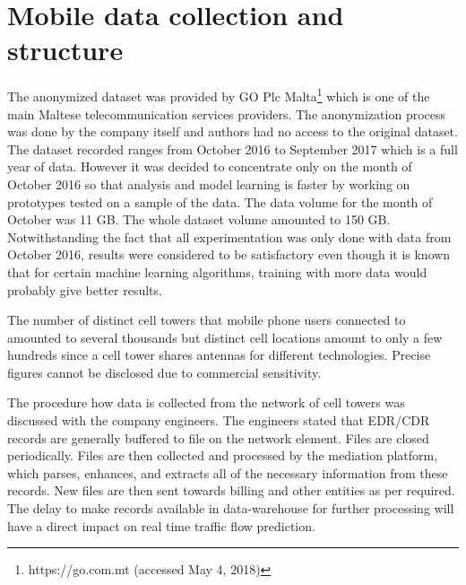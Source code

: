 \documentclass[12pt, a4paper]{report}
\theoremstyle{definition}
\theoremstyle{definition}%
\theoremstyle{definition}%
\theoremstyle{definition}%
\theoremstyle{definition}%
\theoremstyle{definition}%
\begin{document}
\section{Mobile data collection and structure} \label{section:methodology:mobile_data_collection_structure}

The anonymized dataset was provided by GO Plc Malta\footnote{https://go.com.mt (accessed May 4, 2018)} which is one of the main Maltese telecommunication services providers. The anonymization process was done by the company itself and authors had no access to the original dataset. The dataset recorded ranges from October 2016 to September 2017 which is a full year of data. However it was decided to concentrate only on the month of October 2016 so that analysis and model learning is faster by working on prototypes tested on a sample of the data. The data volume for the month of October was 11 GB. The whole dataset volume amounted to 150 GB. Notwithstanding the fact that all experimentation was only done with data from October 2016, results were considered to be satisfactory even though it is known that for certain machine learning algorithms, training with more data would probably give better results. 

The number of distinct cell towers that mobile phone users connected to amounted to several thousands but distinct cell locations amount to only a few hundreds since a cell tower shares antennas for different technologies. Precise figures cannot be disclosed due to commercial sensitivity.

The procedure how data is collected from the network of cell towers was discussed with the company engineers. The engineers stated that EDR/CDR records are generally buffered to file on the network element. Files are closed periodically. Files are then collected and processed by the mediation platform, which parses, enhances, and extracts all of the necessary information from these records. New files are then sent towards billing and other entities as per required. The delay to make records available in data-warehouse for further processing will have a direct impact on real time traffic flow prediction.
\end{document}

